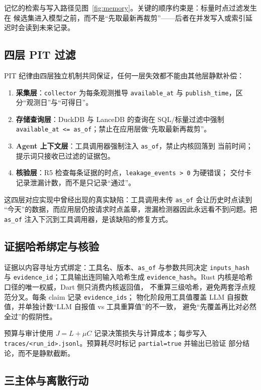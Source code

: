 \documentclass[UTF8,fontset=fandol,11pt,a4paper]{ctexart}
\begin{document}
记忆的检索与写入路径见图~\ref{fig:memory}。关键的顺序约束是：标量时点过滤发生在
候选集进入模型之前，而不是“先取最新再裁剪”——后者在并发写入或索引延迟时会读到未来记录。

\subsection{四层 PIT 过滤}

PIT 纪律由四层独立机制共同保证，任何一层失效都不能由其他层静默补偿：
\begin{enumerate}
  \item \textbf{采集层}：\texttt{collector} 为每条观测推导 \texttt{available\_at} 与
        \texttt{publish\_time}，区分“观测日”与“可得日”。
  \item \textbf{存储查询层}：DuckDB 与 LanceDB 的查询在 SQL/标量过滤中强制
        \texttt{available\_at <= as\_of}；禁止在应用层做“先取最新再裁剪”。
  \item \textbf{Agent 上下文层}：工具调用器强制注入 \texttt{as\_of}，禁止内核回落到
        当前时间；提示词只接收已过滤的证据包。
  \item \textbf{核验层}：R5 检查每条证据的时点，\texttt{leakage\_events > 0} 为硬错误；
        交付卡记录泄漏计数，而不是只记录“通过”。
\end{enumerate}
这四层对应实现中曾经出现的真实缺陷：工具调用未传 \texttt{as\_of} 会让历史时点读到
“今天”的数据，而应用层仍按请求时点盖章，泄漏检测器因此永远看不到问题。把
\texttt{as\_of} 注入下沉到工具调用器，是该缺陷的修复方式。

\subsection{证据哈希绑定与核验}

证据以内容寻址方式绑定：工具名、版本、\texttt{as\_of} 与参数共同决定
\texttt{inputs\_hash} 与 \texttt{evidence\_id}；工具输出连同输入哈希生成
\texttt{evidence\_hash}。Rust 内核是哈希口径的唯一权威，Dart 侧只消费内核返回值，
不重算三级哈希，避免两套浮点规范分叉。每条 claim 记录 \texttt{evidence\_ids}；
物化阶段用工具值覆盖 LLM 自报数值，并单独计数“LLM 自报值 vs 工具重算值”的不一致，
避免“先覆盖再比对必然全过”的假阴性。

预算与审计使用 $J = L + \mu C$ 记录决策损失与计算成本；每步写入
\texttt{traces/<run\_id>.jsonl}。预算耗尽时标记 \texttt{partial=true} 并输出已验证
部分结论，而不是静默截断。

\subsection{三主体与离散行动}
\end{document}
